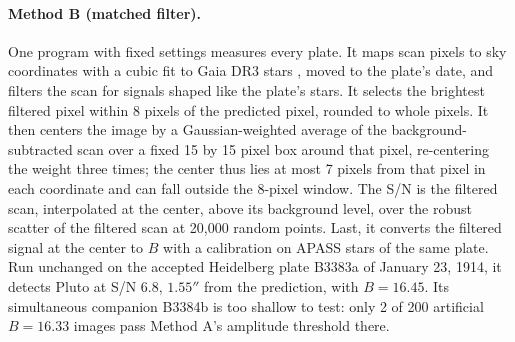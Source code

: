 \documentclass[11pt]{article}
\begin{document}
\paragraph{Method B (matched filter).}
One program with fixed settings measures every plate. It maps scan pixels to sky coordinates with a cubic fit to Gaia DR3 stars \cite{Gaia2023}, moved to the plate's date, and filters the scan for signals shaped like the plate's stars. It selects the brightest filtered pixel within 8 pixels of the predicted pixel, rounded to whole pixels. It then centers the image by a Gaussian-weighted average of the background-subtracted scan over a fixed 15 by 15 pixel box around that pixel, re-centering the weight three times; the center thus lies at most 7 pixels from that pixel in each coordinate and can fall outside the 8-pixel window. The S/N is the filtered scan, interpolated at the center, above its background level, over the robust scatter of the filtered scan at 20,000 random points. Last, it converts the filtered signal at the center to $B$ with a calibration on APASS stars \cite{Henden2016} of the same plate. Run unchanged on the accepted Heidelberg plate B3383a of January 23, 1914, it detects Pluto at S/N 6.8, $1.55''$ from the prediction, with $B=16.45$. Its simultaneous companion B3384b is too shallow to test: only 2 of 200 artificial $B=16.33$ images pass Method A's amplitude threshold there.
\end{document}
